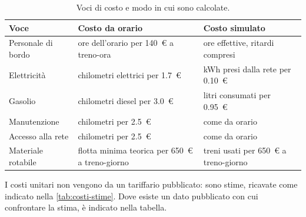 \begin{table}[H]
	\centering
	\caption{Voci di costo e modo in cui sono calcolate.}
	\label{tab:costi-voci}
	\begin{tabularx}{\textwidth}{lXX}
		\toprule
		Voce & Costo da orario & Costo simulato \\
		\midrule
		Personale di bordo & ore dell'orario per \SI{140}{\euro} a treno-ora & ore effettive, ritardi compresi \\
		Elettricità & chilometri elettrici per \SI{1,7}{\euro} & kWh presi dalla rete per \SI{0,10}{\euro} \\
		Gasolio & chilometri diesel per \SI{3,0}{\euro} & litri consumati per \SI{0,95}{\euro} \\
		Manutenzione & chilometri per \SI{2,5}{\euro} & come da orario \\
		Accesso alla rete & chilometri per \SI{2,5}{\euro} & come da orario \\
		Materiale rotabile & flotta minima teorica per \SI{650}{\euro} a treno-giorno & treni usati per \SI{650}{\euro} a treno-giorno \\
		\bottomrule
	\end{tabularx}
\end{table}

I costi unitari non vengono da un tariffario pubblicato: sono stime, ricavate come indicato nella \cref{tab:costi-stime}. Dove esiste un dato pubblicato con cui confrontare la stima, è indicato nella tabella.

